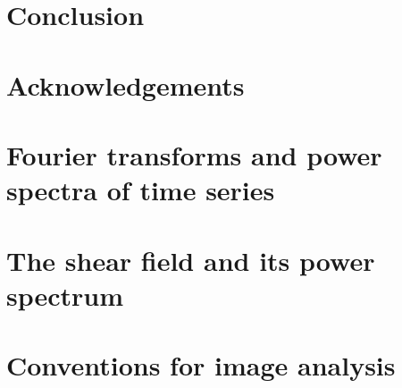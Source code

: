 \documentclass[preprint]{aastex}
\begin{document}


\section{Conclusion}


\section*{Acknowledgements}

\appendix

\section{Fourier transforms and power spectra of time series}
\label{sec:FTTime}



\section{The shear field and its power spectrum}
\label{sec:Fourier-tensor}



\section{Conventions for image analysis}
\label{sec:ellipticity}




\end{document}
